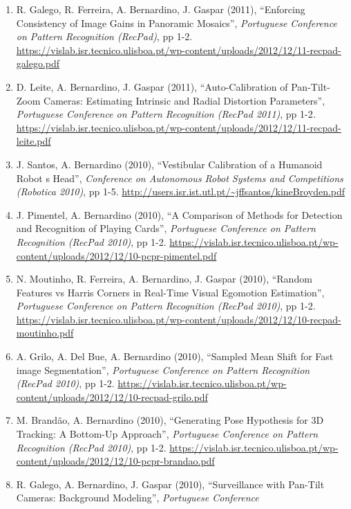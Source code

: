\begin{enumerate}
  \emph{Portuguese Conference on Pattern Recognition (RecPad)}, pp 1-2.
\item
  R. Galego, R. Ferreira, A. Bernardino, J. Gaspar (2011), ``Enforcing
  Consistency of Image Gains in Panoramic Mosaics'', \emph{Portuguese
  Conference on Pattern Recognition (RecPad)}, pp 1-2.
  \url{https://vislab.isr.tecnico.ulisboa.pt/wp-content/uploads/2012/12/11-recpad-galego.pdf}
\item
  D. Leite, A. Bernardino, J. Gaspar (2011), ``Auto-Calibration of
  Pan-Tilt-Zoom Cameras: Estimating Intrinsic and Radial Distortion
  Parameters'', \emph{Portuguese Conference on Pattern Recognition
  (RecPad 2011)}, pp 1-2\emph{.}
  \url{https://vislab.isr.tecnico.ulisboa.pt/wp-content/uploads/2012/12/11-recpad-leite.pdf}
\item
  J. Santos, A. Bernardino (2010), ``Vestibular Calibration of a
  Humanoid Robot\textquotesingle{} s Head'', \emph{Conference on
  Autonomous Robot Systems and Competitions (Robotica 2010)}, pp 1-5.
  \url{http://users.isr.ist.utl.pt/~jffsantos/kineBroyden.pdf}
\item
  J. Pimentel, A. Bernardino (2010), ``A Comparison of Methods for
  Detection and Recognition of Playing Cards'', \emph{Portuguese
  Conference on Pattern Recognition (RecPad 2010)}, pp 1-2.
  \url{https://vislab.isr.tecnico.ulisboa.pt/wp-content/uploads/2012/12/10-pcpr-pimentel.pdf}
\item
  N. Moutinho, R. Ferreira, A. Bernardino, J. Gaspar (2010), ``Random
  Features vs Harris Corners in Real-Time Visual Egomotion Estimation'',
  \emph{Portuguese Conference on Pattern Recognition (RecPad 2010)}, pp
  1-2.
  \url{https://vislab.isr.tecnico.ulisboa.pt/wp-content/uploads/2012/12/10-recpad-moutinho.pdf}
\item
  A. Grilo, A. Del Bue, A. Bernardino (2010), ``Sampled Mean Shift for
  Fast image Segmentation'', \emph{Portuguese Conference on Pattern
  Recognition (RecPad 2010)}, pp 1-2.
  \url{https://vislab.isr.tecnico.ulisboa.pt/wp-content/uploads/2012/12/10-recpad-grilo.pdf}
\item
  M. Brandão, A. Bernardino (2010), ``Generating Pose Hypothesis for 3D
  Tracking: A Bottom-Up Approach'', \emph{Portuguese Conference on
  Pattern Recognition (RecPad 2010)}, pp 1-2.
  \url{https://vislab.isr.tecnico.ulisboa.pt/wp-content/uploads/2012/12/10-pcpr-brandao.pdf}
\item
  R. Galego, A. Bernardino, J. Gaspar (2010), ``Surveillance with
  Pan-Tilt Cameras: Background Modeling'', \emph{Portuguese Conference
}
\end{enumerate}
